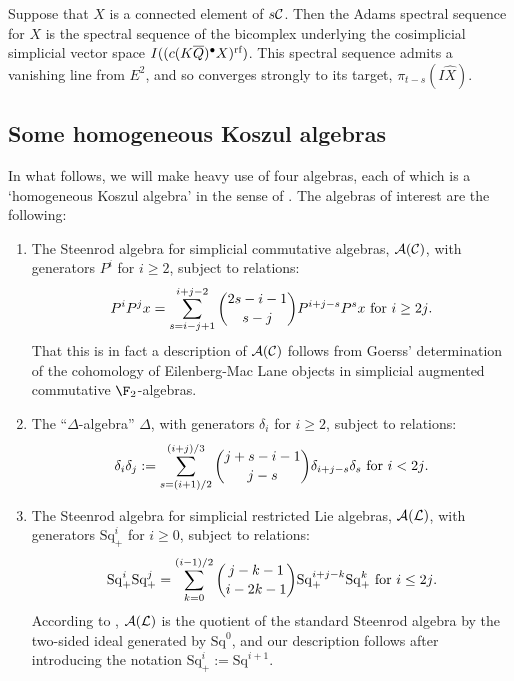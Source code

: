 \documentclass[10pt]{article}
\newcommand{\SqShift}{\Sq_{+}}
\newcommand{\Sq}{\mathrm{Sq}}
\newcommand{\Comm}{\calC}
\newcommand{\LieSteen}{\calA(\calL)}
\newcommand{\CommSteen}{\calA(\Comm)}
\newcommand{\deltaAlgebra}{\Delta}
\begin{document}
\begin{TotalisationInSAlg}
\begin{cor}
\end{cor}
\begin{cor}
Suppose that $X$ is a connected element of $s\Comm$. Then the Adams spectral sequence for $X$ is the spectral sequence of the bicomplex underlying the cosimplicial simplicial vector space $I((c(K\overline{Q})^\bullet X)^{\textup{rf}})$. This spectral sequence admits a vanishing line from $E^2$, and so converges strongly to its target, $\pi_{t-s}(I\hat X)$.
\end{cor}
\end{TotalisationInSAlg}

\begin{SteenrodAlgebrasAndTheirKoszulDuals}
\section{Some homogeneous Koszul algebras}
In what follows, we will make heavy use of four algebras, each of which is a `homogeneous Koszul algebra' in the sense of \cite{PriddyKoszul.pdf}. The algebras of interest are the following:
\begin{enumerate}\squishlist
\setlength{\parindent}{.25in}
\item The Steenrod algebra for simplicial commutative algebras, $\CommSteen$, with generators $P^i$ for $i\geq2$, subject to relations:
\[P^iP^jx=\sum_{s=i-j+1}^{i+j-2}{2s-i-1\choose s-j}P^{i+j-s}P^sx\textup{ for $i\geq2j$}.\]
That this is in fact a description of $\CommSteen$ follows from Goerss' determination \cite[p.14]{MR1089001} of the cohomology of Eilenberg-Mac Lane objects in simplicial augmented commutative $\F_2$-algebras.

\item The ``$\Delta$-algebra'' $\deltaAlgebra$, with generators $\delta_i$ for $i\geq2$, subject to relations:
\[\delta_i\delta_j:=\sum_{s=(i+1)/2}^{(i+j)/3}{j+s-i-1\choose j-s}\delta_{i+j-s}\delta_s\textup{ for $i<2j$.}\]
\item The Steenrod algebra for simplicial restricted Lie algebras, $\LieSteen$, with generators $\SqShift^i$ for $i\geq0$, subject to relations:
\[\SqShift^i\SqShift^j=\sum_{k=0}^{(i-1)/2}{j-k-1\choose i-2k-1}\SqShift^{i+j-k}\SqShift^k\textup{\ for $i\leq2j$.}\]
According to \cite[\S7]{PriddySimplicialLie.pdf}, $\LieSteen$ is the quotient of the standard Steenrod algebra by the two-sided ideal generated by $\Sq^0$, and our description follows after introducing the notation $\SqShift^i:=\Sq^{i+1}$.
%


\end{enumerate}
\end{SteenrodAlgebrasAndTheirKoszulDuals}
\end{document}
